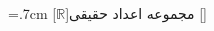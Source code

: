 \thispagestyle{plain}
\begin{multicols*}{2}
\begin{acronym}[\lr{CPU}]
\baselineskip=.7cm
[$\mathbb{R}$]{مجموعه اعداد حقیقی}
[]{}
\end{acronym}
\end{multicols*}

\cleardoublepage

